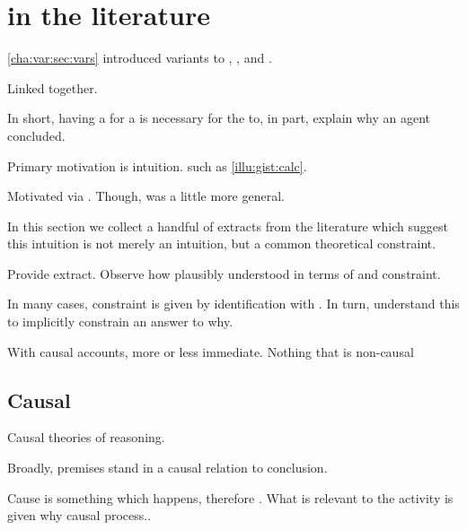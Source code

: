 \section{\issueConstraint{} in the literature}
\label{cha:clar:sec:literature}

\begin{note}
  \autoref{cha:var:sec:vars} introduced variants to \qWhy{}, \qHow{}, and \issueInclusion{}.

  Linked together.

  In short, having a  for a \ros{} is necessary for the \ros{} to, in part, explain why an agent concluded.

  Primary motivation is intuition.
   such as \autoref{illu:gist:calc}.

  Motivated via \citeauthor{Davidson:1963aa}.
  Though, \citeauthor{Davidson:1963aa} was a little more general.

  In this section we collect a handful of extracts from the literature which suggest this intuition is not merely an intuition, but a common theoretical constraint.

  Provide extract.
  Observe how plausibly understood in terms of \wit{} and constraint.

  In many cases, constraint is given by identification with \wit{}.
  In turn, understand this to implicitly constrain an answer to why.

  With causal accounts, more or less immediate.
  Nothing that is non-causal
\end{note}


\subsection{Causal}
\label{cha:clar:sec:literature:causal}

\begin{note}
  Causal theories of reasoning.

  Broadly, premises stand in a causal relation to conclusion.

  Cause is something which happens, therefore \wit{}.
  What is relevant to the activity is given why causal process..
\end{note}

\subsubsection{\textcite{Armstrong:1968vh}}

